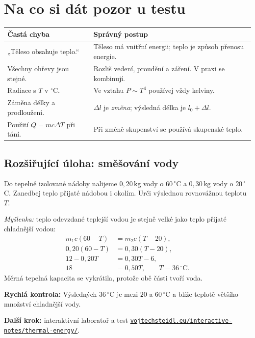 \documentclass[11pt,a4paper]{article}
\newcommand{\unit}[1]{\,\mathrm{#1}}
\begin{document}
\section*{Na co si dát pozor u testu}
\begin{tabular}{@{}p{.32\linewidth}p{.61\linewidth}@{}}
\toprule
\textbf{Častá chyba} & \textbf{Správný postup}\\
\midrule
„Těleso obsahuje teplo.“ & Těleso má vnitřní energii; teplo je způsob přenosu energie.\\
Všechny ohřevy jsou stejné. & Rozliš vedení, proudění a záření. V praxi se kombinují.\\
Radiace s $T$ v $^\circ$C. & Ve vztahu $P\sim T^4$ používej vždy kelviny.\\
Záměna délky a prodloužení. & $\Delta l$ je \emph{změna}; výsledná délka je $l_0+\Delta l$.\\
Použití $Q=mc\Delta T$ při tání. & Při změně skupenství se používá skupenské teplo.\\
\bottomrule
\end{tabular}

\subsection*{Rozšiřující úloha: směšování vody}
Do tepelně izolované nádoby nalijeme $0{,}20\unit{kg}$ vody o $60\,^\circ$C a
$0{,}30\unit{kg}$ vody o $20\,^\circ$C. Zanedbej teplo přijaté nádobou i okolím.
Urči výslednou rovnovážnou teplotu $T$.

\emph{Myšlenka:} teplo odevzdané teplejší vodou je stejně velké jako teplo přijaté chladnější vodou:
\begin{align*}
m_1c(60-T)&=m_2c(T-20),\\
0{,}20(60-T)&=0{,}30(T-20),\\
12-0{,}20T&=0{,}30T-6,\\
18&=0{,}50T,\qquad \boxed{T=36\,^\circ\mathrm C}.
\end{align*}
Měrná tepelná kapacita se vykrátila, protože obě části tvoří voda.

\textbf{Rychlá kontrola:} Výsledných $36\,^\circ$C je mezi $20$ a $60\,^\circ$C a blíže teplotě většího množství chladnější vody.

\vspace{2mm}
\textbf{Další krok:} interaktivní laboratoř a test \href{https://vojtechsteidl.eu/interactive-notes/thermal-energy/}{\texttt{vojtechsteidl.eu/interactive-notes/thermal-energy/}}.
\end{document}

